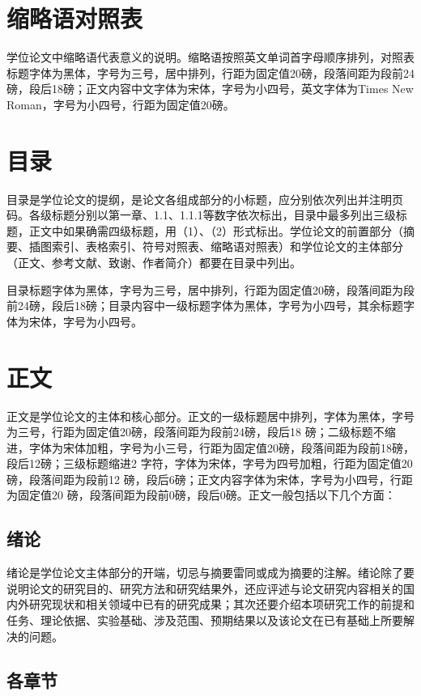 \section{缩略语对照表}
学位论文中缩略语代表意义的说明。缩略语按照英文单词首字母顺序排列，对照表标题字体为黑体，字号为三号，居中排列，行距为固定值20磅，段落间距为段前24磅，段后18磅；正文内容中文字体为宋体，字号为小四号，英文字体为Times New Roman，字号为小四号，行距为固定值20磅。
\section{目录}
目录是学位论文的提纲，是论文各组成部分的小标题，应分别依次列出并注明页码。各级标题分别以第一章、1.1、1.1.1等数字依次标出，目录中最多列出三级标题，正文中如果确需四级标题，用（1）、（2）形式标出。学位论文的前置部分（摘要、插图索引、表格索引、符号对照表、缩略语对照表）和学位论文的主体部分（正文、参考文献、致谢、作者简介）都要在目录中列出。
\par
目录标题字体为黑体，字号为三号，居中排列，行距为固定值20磅，段落间距为段前24磅，段后18磅；目录内容中一级标题字体为黑体，字号为小四号，其余标题字体为宋体，字号为小四号。
\section{正文}
正文是学位论文的主体和核心部分。正文的一级标题居中排列，字体为黑体，字号为三号，行距为固定值20磅，段落间距为段前24磅，段后18 磅；二级标题不缩进，字体为宋体加粗，字号为小三号，行距为固定值20磅，段落间距为段前18磅，段后12磅；三级标题缩进2 字符，字体为宋体，字号为四号加粗，行距为固定值20磅，段落间距为段前12 磅，段后6磅；正文内容字体为宋体，字号为小四号，行距为固定值20 磅，段落间距为段前0磅，段后0磅。正文一般包括以下几个方面：
\subsection{绪论}
绪论是学位论文主体部分的开端，切忌与摘要雷同或成为摘要的注解。绪论除了要说明论文的研究目的、研究方法和研究结果外，还应评述与论文研究内容相关的国内外研究现状和相关领域中已有的研究成果；其次还要介绍本项研究工作的前提和任务、理论依据、实验基础、涉及范围、预期结果以及该论文在已有基础上所要解决的问题。
\subsection{各章节}
\renewcommand{\algorithmicrequire}{\textbf{Input:}}  %
\renewcommand{\algorithmicensure}{\textbf{Output:}} %

